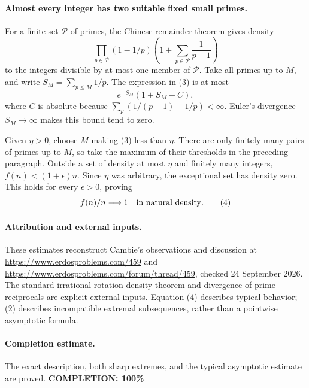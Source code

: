 \paragraph{Almost every integer has two suitable fixed small primes.}
For a finite set \(\mathcal P\) of primes, the Chinese remainder
theorem gives density
\[
 \prod_{p\in\mathcal P}(1-1/p)
 \left(1+\sum_{p\in\mathcal P}\frac1{p-1}\right)
 \tag{3}
\]
to the integers divisible by at most one member of \(\mathcal P\).
Take all primes up to \(M\), and write \(S_M=\sum_{p\leq M}1/p\).
The expression in (3) is at most
\[
 e^{-S_M}(1+S_M+C),
\]
where \(C\) is absolute because
\(\sum_p(1/(p-1)-1/p)<\infty\).
Euler's divergence \(S_M\to\infty\) makes this bound tend to zero.

Given \(\eta>0\), choose \(M\) making (3) less than \(\eta\).
There are only finitely many pairs of primes up to \(M\), so take
the maximum of their thresholds in the preceding paragraph.
Outside a set of density at most \(\eta\) and finitely many integers,
\(f(n)<(1+\epsilon)n\). Since \(\eta\) was arbitrary, the exceptional
set has density zero. This holds for every \(\epsilon>0\), proving
\[
 f(n)/n\longrightarrow1\quad\hbox{in natural density}.
 \tag{4}
\]

\paragraph{Attribution and external inputs.}
These estimates reconstruct Cambie's observations and discussion at
\url{https://www.erdosproblems.com/459} and
\url{https://www.erdosproblems.com/forum/thread/459},
checked 24 September 2026. The standard irrational-rotation density
theorem and divergence of prime reciprocals are explicit external inputs.
Equation (4) describes typical behavior; (2) describes incompatible
extremal subsequences, rather than a pointwise asymptotic formula.

\paragraph{Completion estimate.}
The exact description, both sharp extremes, and the typical asymptotic estimate are proved.
\textbf{COMPLETION: 100\%}
